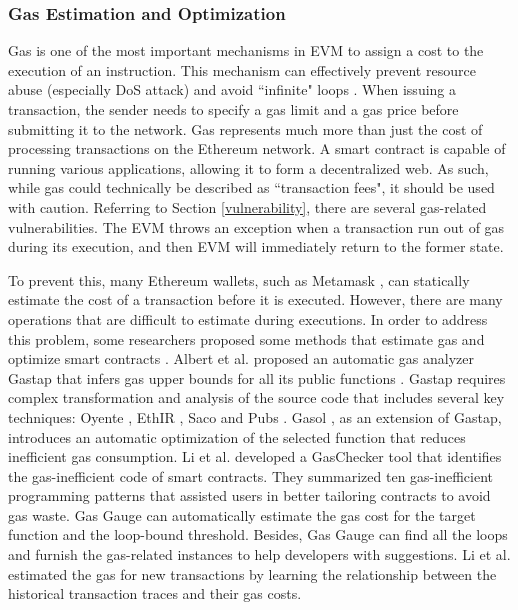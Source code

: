 \documentclass[manuscript,screen]{acmart}
\begin{document}
\subsubsection{Gas Estimation and Optimization}
Gas is one of the most important mechanisms in EVM to assign a cost to the execution of an instruction. This mechanism can effectively prevent resource abuse (especially DoS attack) and avoid ``infinite" loops \cite{ChenLWCLLAZ17}. When issuing a transaction, the sender needs to specify a gas limit and a gas price before submitting it to the network. Gas represents much more than just the cost of processing transactions on the Ethereum network. A smart contract is capable of running various applications, allowing it to form a decentralized web.
As such, while gas could technically be described as ``transaction fees", it should be used with caution. Referring to Section \ref{vulnerability}, there are several gas-related vulnerabilities. 
The EVM throws an exception when a transaction run out of gas during its execution, and then EVM will immediately return to the former state.

To prevent this, many Ethereum wallets, such as Metamask \cite{METAMASK}, can statically estimate the cost of a transaction before it is executed.
However, there are many operations that are difficult to estimate during executions. In order to address this problem, some researchers proposed some methods that estimate gas and optimize smart contracts \cite{AlbertGRS19,ashraf2020gasfuzzer, danielius2020}. 
Albert et al. proposed an automatic gas analyzer Gastap that infers gas upper bounds for all its public functions \cite{AlbertGRS19}. Gastap requires complex transformation and analysis of the source code that includes several key techniques: Oyente \cite{LuuCOSH16}, EthIR \cite{AlbertGLRS18}, Saco \cite{AlbertAFGGMPR14} and Pubs \cite{AlbertAGP08}.
Gasol \cite{AlbertCGRR20}, as an extension of Gastap, introduces an automatic optimization of the selected function that reduces inefficient gas consumption. Li et al. \cite{ChenFLZLLXCZ21} developed a GasChecker tool that identifies the gas-inefficient code of smart contracts. They summarized ten gas-inefficient programming patterns that assisted users in better tailoring contracts to avoid gas waste.
Gas Gauge \cite{abs-2112-14771} can automatically estimate the gas cost for the target function and the loop-bound threshold. Besides, Gas Gauge can find all the loops and furnish the gas-related instances to help developers with suggestions.
Li et al. \cite{LiNCYH20} estimated the gas for new transactions by learning the relationship between the historical transaction traces and their gas costs.
\end{document}
